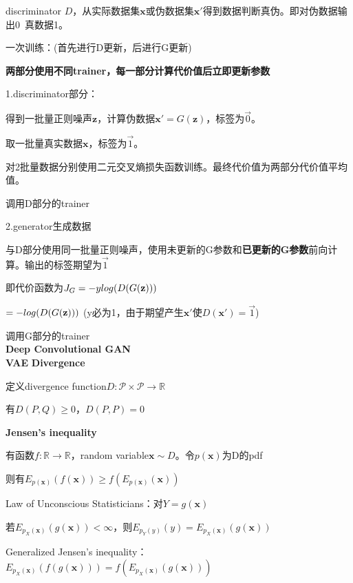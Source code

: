 \documentclass[UTF8]{ctexart}
\begin{document}
  discriminator $D$，从实际数据集$\mathbf{x}$或伪数据集$\mathbf{x}'$得到数据判断真伪。即对伪数据输出0\ 真数据1。

  一次训练：(首先进行D更新，后进行G更新)

  \quad \textbf{两部分使用不同trainer，每一部分计算代价值后立即更新参数}

  \quad 1.discriminator部分：
  
  \quad \quad 得到一批量正则噪声$\mathbf{z}$，计算伪数据$\mathbf{x}' = G(\mathbf{z})$，标签为$\vec{0}$。
  
  \quad \quad 取一批量真实数据$\mathbf{x}$，标签为$\vec{1}$。
  
  \quad \quad 对2批量数据分别使用二元交叉熵损失函数训练。最终代价值为两部分代价值平均值。

  \quad \quad 调用D部分的trainer

  \quad 2.generator生成数据

  \quad \quad 与D部分使用同一批量正则噪声，使用未更新的G参数和\textbf{已更新的G参数}前向计算。输出的标签期望为$\vec{1}$
  
  \quad \quad 即代价函数为$J_G = -y \space log(D(G(\mathbf{z})))$ 
  
  \quad \quad \quad $ = - \space log(D(G(\mathbf{z})))$ (y必为1，由于期望产生$\mathbf{x}'$使$D(\mathbf{x}') = \vec{1}$)
  
  \quad \quad 调用G部分的trainer\\
\textbf{Deep Convolutional GAN}\\

\textbf{VAE}
  \textbf{Divergence}

  \quad 定义divergence function$D: \mathcal{P} \times \mathcal{P} \rightarrow \mathbb{R} $
  
  \quad 有$D(P, Q) \geq 0$，$D(P, P) = 0$

  \textbf{Jensen's inequality}

  \quad 有函数$f: \mathbb{R} \to \mathbb{R} $，random variable$\mathbf{x} \sim D$。令$p(\mathbf{x})$为D的pdf

  \quad 则有$E_{p(\mathbf{x})}(f(\mathbf{x})) \geq f(E_{p(\mathbf{x})}(\mathbf{x}))$

  \quad Law of Unconscious Statisticians：对$Y = g(\mathbf{x})$
  
  \quad \quad 若$E_{p_X(\mathbf{x})}(g(\mathbf{x})) < \infty$，则$E_{p_Y(y)}(y) = E_{p_X(\mathbf{x})}(g(\mathbf{x}))$

  \quad Generalized Jensen's inequality：$E_{p_X(\mathbf{x})}(f(g(\mathbf{x}))) = f(E_{p_X(\mathbf{x})}(g(\mathbf{x})))$
\end{document}
